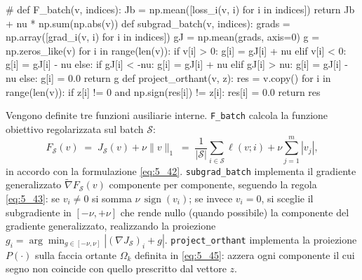 \documentclass[a4paper,12pt]{article}
\numberwithin{equation}{section}
\numberwithin{figure}{section}
\numberwithin{table}{section}
\begin{document}
\begin{pythoncode}[title= Newton-L1]

#
    def F_batch(v, indices):
        Jb = np.mean([loss_i(v, i) for i in indices])
        return Jb + nu * np.sum(np.abs(v))
    def subgrad_batch(v, indices):
        grads = np.array([grad_i(v, i) for i in indices])
        gJ = np.mean(grads, axis=0)
        g = np.zeros_like(v)
        for i in range(len(v)):
            if v[i] > 0:
                g[i] = gJ[i] + nu
            elif v[i] < 0:
                g[i] = gJ[i] - nu
            else:
                if gJ[i] < -nu:
                    g[i] = gJ[i] + nu
                elif gJ[i] > nu:
                    g[i] = gJ[i] - nu
                else:
                    g[i] = 0.0
        return g
    def project_orthant(v, z):
        res = v.copy()
        for i in range(len(v)):
            if z[i] != 0 and np.sign(res[i]) != z[i]:
                res[i] = 0.0
        return res
\end{pythoncode}
Vengono definite tre funzioni ausiliarie interne. \texttt{F\_batch} calcola la funzione obiettivo regolarizzata sul batch $\mathcal{S}$:
\[
F_{\mathcal{S}}(v) \;=\; J_{\mathcal{S}}(v) + \nu\|v\|_1
\;=\; \frac{1}{|\mathcal{S}|}\sum_{i\in\mathcal{S}}\ell(v;i) + \nu\sum_{j=1}^{m}|v_j|,
\]
in accordo con la formulazione \eqref{eq:5_42}. \texttt{subgrad\_batch} implementa il gradiente generalizzato $\widetilde{\nabla} F_{\mathcal{S}}(v)$ componente per componente, seguendo la regola \eqref{eq:5_43}: se $v_i\neq 0$ si somma $\nu\,\operatorname{sign}(v_i)$; se invece $v_i=0$, si sceglie il subgradiente in $[-\nu,+\nu]$ che rende nullo (quando possibile) la componente del gradiente generalizzato, realizzando la proiezione $g_i = \arg\min_{g\in[-\nu,\nu]} |(\nabla J_{\mathcal{S}})_i + g|$. \texttt{project\_orthant} implementa la proiezione $P(\cdot)$ sulla faccia ortante $\Omega_k$ definita in \eqref{eq:5_45}: azzera ogni componente il cui segno non coincide con quello prescritto dal vettore $z$.
\end{document}
